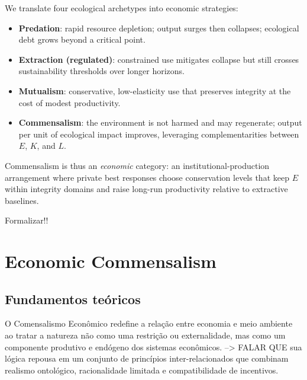 \documentclass[a4paper,12pt,oneside,brazil,english]{abntex2}
\begin{document}
We translate four ecological archetypes into economic strategies:

\begin{itemize}
\item \textbf{Predation}: rapid resource depletion; output surges then collapses; ecological debt grows beyond a critical point.
\item \textbf{Extraction (regulated)}: constrained use mitigates collapse but still crosses sustainability thresholds over longer horizons.
\item \textbf{Mutualism}: conservative, low-elasticity use that preserves integrity at the cost of modest productivity.
\item \textbf{Commensalism}: the environment is not harmed and may regenerate; output per unit of ecological impact improves, leveraging complementarities between $E$, $K$, and $L$.
\end{itemize}

Commensalism is thus an \emph{economic} category: an institutional-production arrangement where private best responses choose conservation levels that keep $E$ within integrity domains and raise long-run productivity relative to extractive baselines.

Formalizar!!


\section{Economic Commensalism}

\subsection{Fundamentos teóricos}

O Comensalismo Econômico redefine a relação entre economia e meio ambiente ao tratar a natureza não como uma restrição ou externalidade, mas como um componente produtivo e endógeno dos sistemas econômicos. 
--> FALAR QUE sua lógica repousa em um conjunto de princípios inter-relacionados que combinam realismo ontológico, racionalidade limitada e compatibilidade de incentivos.
\end{document}
